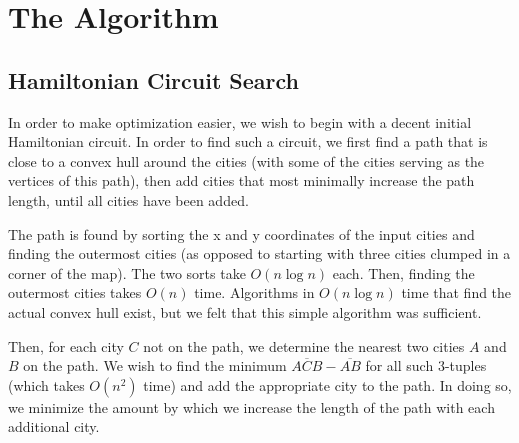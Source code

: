 \documentclass[letterpaper,12pt]{article}
\begin{document}

	\section{The Algorithm}
		\subsection{Hamiltonian Circuit Search}
			In order to make optimization easier, we wish to begin with
			a decent initial Hamiltonian circuit. In order to find such
			a circuit, we first find a path that is close to a convex hull
			around the cities (with some of the cities serving as the vertices
			of this path), then add cities that most minimally increase the
			path length, until all cities have been added.

			The path is found by sorting the x and y coordinates of the input
			cities and finding the outermost cities (as opposed to starting
			with three cities clumped in a corner of the map). The two sorts
			take $O(n \log n)$ each. Then, finding the outermost cities takes
			$O(n)$ time. Algorithms in $O(n \log n)$ time that find the actual
			convex hull exist, but we felt that this simple algorithm was
			sufficient.

			Then, for each city $C$ not on the path, we determine the nearest
			two cities $A$ and $B$ on the path. We wish to find the minimum
			$\overline{ACB} - \overline{AB}$ for all such 3-tuples (which takes
			$O(n^2)$ time) and add the appropriate city to the path. In doing
			so, we minimize the amount by which we increase the length of the
			path with each additional city.
\end{document}
